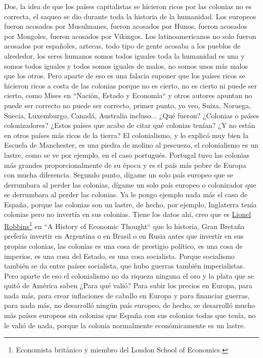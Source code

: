 Dos, la idea de que los países capitalistas se hicieron ricos por las colonias no es correcta, el saqueo se dio durante toda la historia de la humanidad. Los europeos fueron acosados por Musulmanes, fueron acosados por Hunos, fueron acosados por Mongoles, fueron acosados por Vikingos. Los latinoamericanos no solo fueron acosados por españoles, aztecas, todo tipo de gente acosaba a los pueblos de alrededor, los seres humanos somos todos iguales toda la humanidad es una y somos todos iguales y todos somos iguales de malos, no somos unos más malos que los otros. Pero aparte de eso es una falacia suponer que los países ricos se hicieron ricos a costa de las colonias porque no es cierto, no es cierto ni puede ser cierto, como Mises en ``Nación, Estado y Economía``\cite{vonmises1919nation} y otros autores apuntan no puede ser correcto no puede ser correcto, primer punto, yo veo, Suiza, Noruega, Suecia, Luxemburgo, Canadá, Australia incluso... ¿Qué fueron? ¿Colonias o países colonizadores? ¿Estos países que acabo de citar qué colonias tenían? ¿Y no están en otros países más ricos de la tierra? El colonialismo, y lo explicó muy bien la Escuela de Manchester, es una piedra de molino al pescuezo, el colonialismo es un lastre, como se ve por ejemplo, en el caso portugués. Portugal tuvo las colonias más grandes proporcionalmente de su época y es el país más pobre de Europa con mucha diferencia. Segundo punto, dígame un solo país europeo que se derrumbara al perder las colonias, dígame un solo país europeo o colonizador que se derrumbara al perder las colonias. Ya le pongo ejemplo nada más el caso de España, porque las colonias son un lastre, de hecho, por ejemplo, Inglaterra tenía colonias pero no invertía en sus colonias. Tiene los datos ahí, creo que es \href{https://en.wikipedia.org/wiki/Lionel_Robbins}{Lionel Robbins}\footnote{Economista británico y miembro del London School of Economics.} en ``A History of Economic Thought``\cite{robbins1998history} que lo historia, Gran Bretaña prefería invertir en Argentina o en Brasil o en Rusia antes que invertir en sus propias colonias, las colonias es una cosa de prestigio político, es una cosa de imperios, es una cosa del Estado, es una cosa socialista. Porque socialismo también se da entre países socialista, que hubo guerras también imperialistas. Pero aparte de eso el colonialismo no da riqueza ninguna el oro y la plata que se quitó de América saben ¿Para qué valió? Para subir los precios en Europa, para nada más, para crear inflaciones de caballo en Europa y para financiar guerras, para nada más, no desarrolló ningún país europeo, de hecho, se desarrolló mucho más países europeos sin colonias que España con sus colonias todas que tenía,
no le valió de nada, porque la colonia normalmente económicamente es un lastre.

